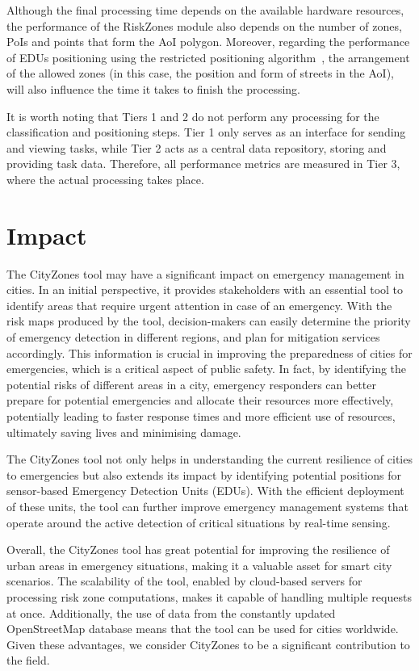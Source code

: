 \begin{refsection}
Although the final processing time depends on the available hardware resources, the performance of the RiskZones module also depends on the number of zones, PoIs and points that form the AoI polygon. Moreover, regarding the performance of EDUs positioning using the restricted positioning algorithm~\cite{riskzones}, the arrangement of the allowed zones (in this case, the position and form of streets in the AoI), will also influence the time it takes to finish the processing.

It is worth noting that Tiers 1 and 2 do not perform any processing for the classification and positioning steps. Tier 1 only serves as an interface for sending and viewing tasks, while Tier 2 acts as a central data repository, storing and providing task data. Therefore, all performance metrics are measured in Tier 3, where the actual processing takes place.


\section{Impact}

The CityZones tool may have a significant impact on emergency management in cities. In an initial perspective, it provides stakeholders with an essential tool to identify areas that require urgent attention in case of an emergency. With the risk maps produced by the tool, decision-makers can easily determine the priority of emergency detection in different regions, and plan for mitigation services accordingly. This information is crucial in improving the preparedness of cities for emergencies, which is a critical aspect of public safety. In fact, by identifying the potential risks of different areas in a city, emergency responders can better prepare for potential emergencies and allocate their resources more effectively, potentially leading to faster response times and more efficient use of resources, ultimately saving lives and minimising damage.

The CityZones tool not only helps in understanding the current resilience of cities to emergencies but also extends its impact by identifying potential positions for sensor-based Emergency Detection Units (EDUs). With the efficient deployment of these units, the tool can further improve emergency management systems that operate around the active detection of critical situations by real-time sensing.

Overall, the CityZones tool has great potential for improving the resilience of urban areas in emergency situations, making it a valuable asset for smart city scenarios. The scalability of the tool, enabled by cloud-based servers for processing risk zone computations, makes it capable of handling multiple requests at once. Additionally, the use of data from the constantly updated OpenStreetMap database means that the tool can be used for cities worldwide. Given these advantages, we consider CityZones to be a significant contribution to the field.


\end{refsection}
